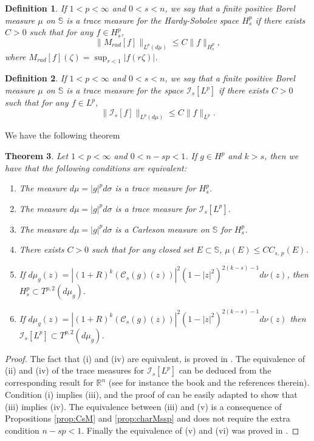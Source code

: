 \documentclass[12pt,twoside,leqno,final]{amsart}
\theoremstyle{plain}
\newtheorem{thm}{Theorem}[section]
\newtheorem{defn}[thm]{Definition}
\begin{document}
 \begin{defn}
 If $1<p<\infty$ and $0<s<n$, we say that a finite positive Borel measure $\mu$ on ${{\mathbb S}}$ is  a trace measure for the Hardy-Sobolev  space $H_s^p$ if  there exists $C>0$ such that for any $f\in H_s^p$,
\begin{equation}\label{qcarlesonmeasure}\|M_{rad}[f]\|_{L^p(d\mu)}\leq C\|f\|_{H_s^p},\end{equation}
where $M_{rad}[f](\zeta)=\sup_{r<1}|f(r\zeta)|$.
\end{defn}
 \begin{defn}
 If $1<p<\infty$ and $0<s<n$, we say that a finite positive Borel measure $\mu$ on ${{\mathbb S}}$ is  a trace measure for the    space $\mathcal{I}_s[L^p]$ if  there exists $C>0$ such that for any $f\in L^p$,
\begin{equation}\label{qcarlesonmeasure2}\|\mathcal{I}_s[f]\|_{L^p(d\mu)}\leq C\|f\|_{L^p}.\end{equation}

\end{defn}
We have the following theorem
\begin{thm} \label{thm:n-sp<1}
Let $1<p<\infty$ and $0<n-sp<1$. If $g\in H^p$  and $k>s$, then we have that the following conditions are equivalent:

\begin{enumerate}
	\item The measure $d\mu=|g|^pd\sigma$ is a trace measure for $H_s^p$.
	\item The measure $d\mu=|g|^pd\sigma $ is a trace measure for $\mathcal{I}_s[L^p]$.
	\item\label{item:n-sp<1} The measure $d\mu=|g|^pd\sigma$ is a Carleson measure on ${{\mathbb S}}$ for $H_s^p$.
	\item There exists $C>0$ such that for any closed set $E\subset {{\mathbb S}}$, $\mu(E)\leq C C_{s,\,p}(E)$.
	\item If  $d\mu_g(z)=|(1+R)^k (\mathcal{C}_s(g)(z))|^2 (1-|z|^2)^{2(k-s)-1}d\nu(z)$, then   $H^p_s\subset  T^{p,2}(d\mu_g)$.
	\item If $d\mu_g(z)=|(1+R)^k (\mathcal{C}_s(g)(z))|^2 (1-|z|^2)^{2(k-s)-1}d\nu(z)$ then   $\mathcal{I}_s[L^p]\subset  T^{p,2}(d\mu_g)$.
\end{enumerate}

\end{thm}
\begin{proof}
The fact that (i) and  (iv) are equivalent, is proved in \cite{cohnverbitsky}. The equivalence of (ii) and  (iv) of the trace measures for $\mathcal{I}_s[L^p]$ can be deduced from the corresponding result for ${{\mathbb R}}^n$ (see for instance the book \cite{adamshedberg} and the references therein). Condition (i) implies (iii), and the proof of \cite{cohnverbitsky} can be easily adapted to show that (iii) implies (iv). The equivalence between (iii) and (v) is a consequence of Propositions \ref{prop:CsM} and \ref{prop:charMssp} and does not require the extra condition $n-sp<1$. Finally the equivalence of (v) and (vi) was proved in \cite{cascanteortega3}.
\end{proof}
\end{document}
